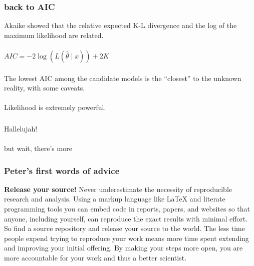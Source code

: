 \documentclass{beamer}\usepackage{graphicx, color}
\begin{document}
\begin{frame}
\frametitle{back to AIC}
Akaike showed that the relative expected K-L divergence and the log of the maximum likelihood are related.
\\~\\
\begin{math}
AIC = -2\log(L(\hat{\theta} \mid x)) + 2K
\end{math}
\\~\\
The lowest AIC among the candidate models is the ``closest'' to the unknown reality, with some caveats.
\\~\\
Likelihood is extremely powerful.

\end{frame}


\begin{frame}
\frametitle{}
\huge{Hallelujah!}
\\~\\
\small{but wait, there's more\!}
\end{frame}


\begin{frame}
\frametitle{Peter's first words of advice}
\textbf{Release your source!}
Never underestimate the necessity of reproducible research and analysis.
Using a markup language like {\LaTeX} and  literate programming tools you can embed code in reports, papers, and websites so that anyone, including yourself, can reproduce the exact results with minimal effort.
So find a source repository and release your source to the world.
The less time people expend trying to reproduce your work means more time spent extending and improving your initial offering.
By making your steps more open, you are more accountable for your work and thus a better scientist.
\end{frame}
\end{document}

